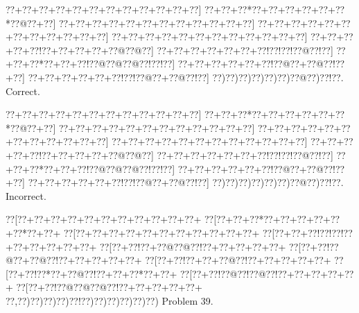 \documentclass[a5paper]{article}
\begin{document}
\begin{center}
{\goo
\0??+\0??+\0??+\0??+\0??+\0??+\0??+\0??+\0??+\0??+\0??+\0??]
\0??+\0??+\0??*\0??+\0??+\0??+\0??+\0??+\0??*\0??@\0??+\0??]
\0??+\0??+\0??+\0??+\0??+\0??+\0??+\0??+\0??+\0??+\0??+\0??]
\0??+\0??+\0??+\0??+\0??+\0??+\0??+\0??+\0??+\0??+\0??+\0??]
\0??+\0??+\0??+\0??+\0??+\0??+\0??+\0??+\0??+\0??+\0??+\0??]
\0??+\0??+\0??+\0??+\0??!\0??+\0??+\0??+\0??+\0??@\0??@\0??]
\0??+\0??+\0??+\0??+\0??+\0??+\0??!\0??!\0??!\0??@\0??!\0??]
\0??+\0??+\0??*\0??+\0??+\0??!\0??@\0??@\0??@\0??!\0??!\0??]
\0??+\0??+\0??+\0??+\0??+\0??!\0??@\0??+\0??@\0??!\0??+\0??]
\0??+\0??+\0??+\0??+\0??+\0??!\0??!\0??@\0??+\0??@\0??!\0??]
\0??)\0??)\0??)\0??)\0??)\0??)\0??@\0??)\0??!\0??.
}
Correct. 

\end{center}
\begin{center}
{\goo
\0??+\0??+\0??+\0??+\0??+\0??+\0??+\0??+\0??+\0??+\0??+\0??]
\0??+\0??+\0??*\0??+\0??+\0??+\0??+\0??+\0??*\0??@\0??+\0??]
\0??+\0??+\0??+\0??+\0??+\0??+\0??+\0??+\0??+\0??+\0??+\0??]
\0??+\0??+\0??+\0??+\0??+\0??+\0??+\0??+\0??+\0??+\0??+\0??]
\0??+\0??+\0??+\0??+\0??+\0??+\0??+\0??+\0??+\0??+\0??+\0??]
\0??+\0??+\0??+\0??+\0??!\0??+\0??+\0??+\0??+\0??@\0??@\0??]
\0??+\0??+\0??+\0??+\0??+\0??+\0??!\0??!\0??!\0??@\0??!\0??]
\0??+\0??+\0??*\0??+\0??+\0??!\0??@\0??@\0??@\0??!\0??!\0??]
\0??+\0??+\0??+\0??+\0??+\0??!\0??@\0??+\0??@\0??!\0??+\0??]
\0??+\0??+\0??+\0??+\0??+\0??!\0??!\0??@\0??+\0??@\0??!\0??]
\0??)\0??)\0??)\0??)\0??)\0??)\0??@\0??)\0??!\0??.
}
Incorrect. 

\end{center}
\newpage
\begin{center}
{\goo
\0??[\0??+\0??+\0??+\0??+\0??+\0??+\0??+\0??+\0??+\0??+\0??+
\0??[\0??+\0??+\0??*\0??+\0??+\0??+\0??+\0??+\0??*\0??+\0??+
\0??[\0??+\0??+\0??+\0??+\0??+\0??+\0??+\0??+\0??+\0??+\0??+
\0??[\0??+\0??+\0??!\0??!\0??!\0??+\0??+\0??+\0??+\0??+\0??+
\0??[\0??+\0??!\0??+\0??@\0??@\0??!\0??+\0??+\0??+\0??+\0??+
\0??[\0??+\0??!\0??@\0??+\0??@\0??!\0??+\0??+\0??+\0??+\0??+
\0??[\0??+\0??!\0??+\0??+\0??@\0??!\0??+\0??+\0??+\0??+\0??+
\0??[\0??+\0??!\0??*\0??+\0??@\0??!\0??+\0??+\0??*\0??+\0??+
\0??[\0??+\0??!\0??@\0??!\0??@\0??!\0??+\0??+\0??+\0??+\0??+
\0??[\0??+\0??!\0??@\0??@\0??@\0??!\0??+\0??+\0??+\0??+\0??+
\0??,\0??)\0??)\0??)\0??)\0??!\0??)\0??)\0??)\0??)\0??)\0??)
}
Problem 39.

\end{center}
\end{document}
